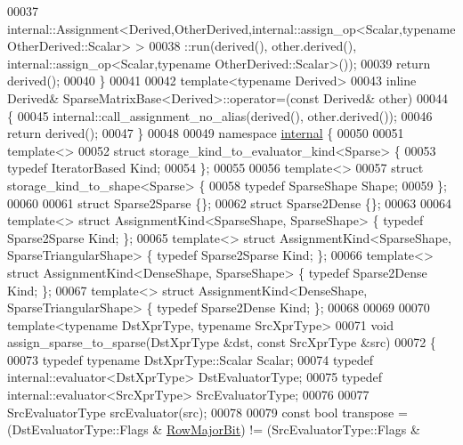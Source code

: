 \begin{DoxyCode}
00037   internal::Assignment<Derived,OtherDerived,internal::assign\_op<Scalar,typename OtherDerived::Scalar> >
00038           ::run(derived(), other.derived(), internal::assign\_op<Scalar,typename OtherDerived::Scalar>());
00039   \textcolor{keywordflow}{return} derived();
00040 \}
00041 
00042 \textcolor{keyword}{template}<\textcolor{keyword}{typename} Derived>
00043 \textcolor{keyword}{inline} Derived& SparseMatrixBase<Derived>::operator=(\textcolor{keyword}{const} Derived& other)
00044 \{
00045   internal::call\_assignment\_no\_alias(derived(), other.derived());
00046   \textcolor{keywordflow}{return} derived();
00047 \}
00048 
00049 \textcolor{keyword}{namespace }\hyperlink{namespaceinternal}{internal} \{
00050 
00051 \textcolor{keyword}{template}<>
00052 \textcolor{keyword}{struct }storage\_kind\_to\_evaluator\_kind<Sparse> \{
00053   \textcolor{keyword}{typedef} IteratorBased Kind;
00054 \};
00055 
00056 \textcolor{keyword}{template}<>
00057 \textcolor{keyword}{struct }storage\_kind\_to\_shape<Sparse> \{
00058   \textcolor{keyword}{typedef} SparseShape Shape;
00059 \};
00060 
00061 \textcolor{keyword}{struct }Sparse2Sparse \{\};
00062 \textcolor{keyword}{struct }Sparse2Dense  \{\};
00063 
00064 \textcolor{keyword}{template}<> \textcolor{keyword}{struct }AssignmentKind<SparseShape, SparseShape>           \{ \textcolor{keyword}{typedef} Sparse2Sparse Kind; \};
00065 \textcolor{keyword}{template}<> \textcolor{keyword}{struct }AssignmentKind<SparseShape, SparseTriangularShape> \{ \textcolor{keyword}{typedef} Sparse2Sparse Kind; \};
00066 \textcolor{keyword}{template}<> \textcolor{keyword}{struct }AssignmentKind<DenseShape,  SparseShape>           \{ \textcolor{keyword}{typedef} Sparse2Dense  Kind; \};
00067 \textcolor{keyword}{template}<> \textcolor{keyword}{struct }AssignmentKind<DenseShape,  SparseTriangularShape> \{ \textcolor{keyword}{typedef} Sparse2Dense  Kind; \};
00068 
00069 
00070 \textcolor{keyword}{template}<\textcolor{keyword}{typename} DstXprType, \textcolor{keyword}{typename} SrcXprType>
00071 \textcolor{keywordtype}{void} assign\_sparse\_to\_sparse(DstXprType &dst, \textcolor{keyword}{const} SrcXprType &src)
00072 \{
00073   \textcolor{keyword}{typedef} \textcolor{keyword}{typename} DstXprType::Scalar Scalar;
00074   \textcolor{keyword}{typedef} internal::evaluator<DstXprType> DstEvaluatorType;
00075   \textcolor{keyword}{typedef} internal::evaluator<SrcXprType> SrcEvaluatorType;
00076 
00077   SrcEvaluatorType srcEvaluator(src);
00078 
00079   \textcolor{keyword}{const} \textcolor{keywordtype}{bool} transpose = (DstEvaluatorType::Flags & \hyperlink{group__flags_gae4f56c2a60bbe4bd2e44c5b19cbe8762}{RowMajorBit}) != (SrcEvaluatorType::Flags & 

\end{DoxyCode}

